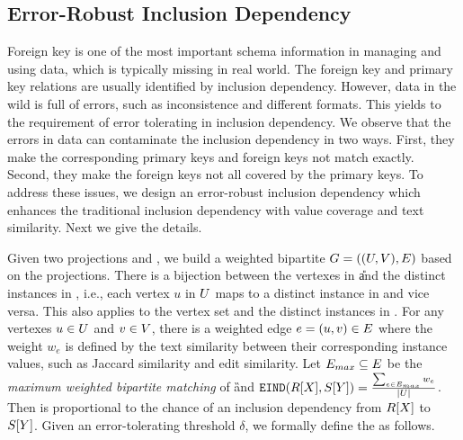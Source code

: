 




\subsection{Error-Robust Inclusion Dependency}\label{subsec:eind}


Foreign key is one of the most important schema information in managing and using data, which is typically missing in real world. The foreign key and primary key relations are usually identified by inclusion dependency. However, data in the wild is full of errors, such as inconsistence and different formats. This yields to the requirement of error tolerating in inclusion dependency. We observe that the errors in data can contaminate the inclusion dependency in two ways. First, they make the corresponding primary keys and foreign keys not match exactly. Second, they make the foreign keys not all covered by the primary keys. To address these issues, we design an error-robust inclusion dependency which enhances the traditional inclusion dependency with value coverage and text similarity. Next we give the details.





Given two projections \RX and \SY, we build a weighted bipartite $G=((U,V),E)$ based on the projections. There is a bijection between the vertexes in \U and the distinct instances in \RX, i.e., each vertex $u$ in $U$ maps to a distinct instance in \RX and vice versa. This also applies to the vertex set \V and the distinct instances in \SY. For any vertexes $u\in U$ and $v\in V$, there is a weighted edge $e=(u,v)\in E$ where the weight $w_e$ is defined by the text similarity between their corresponding instance values, such as Jaccard similarity and edit similarity. Let $E_{max}\subseteq E$ be the \emph{maximum weighted bipartite matching} of \G and $\texttt{EIND}(R[X],S[Y])=\frac{\sum_{e\in E_{max}}w_e}{|U|}$. Then \EIND is proportional to the chance of an inclusion dependency from $R[X]$ to $S[Y]$. Given an error-tolerating threshold $\delta$, we formally define the \eind as follows.


